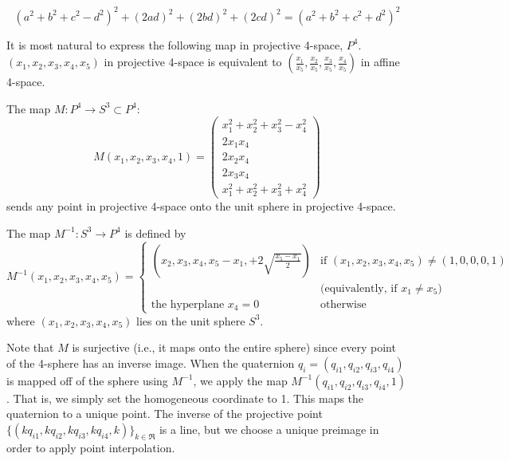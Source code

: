 \begin{lemma}
\begin{equation}
\label{eqn:aida}
(a^2 + b^2 + c^2 - d^2)^2 + (2ad)^2 + (2bd)^2 + (2cd)^2 = 
(a^2 + b^2 + c^2 + d^2)^2
\end{equation}
\end{lemma}

It is most natural to express the following map in projective 4-space, $P^4$.
$(x_1,x_2,x_3,x_4,x_5)$ in projective 4-space is equivalent to
$(\frac{x_1}{x_5},\frac{x_2}{x_5},\frac{x_3}{x_5},\frac{x_4}{x_5})$ 
in affine 4-space.

\begin{corollary}
The map 
$M:P^4 \rightarrow S^3 \subset P^4$:
\begin{equation}
\label{eq:M}
	M(x_1,x_2,x_3,x_4,1) = \left( \begin{array}{c}
		x_1^2+x_2^2+x_3^2-x_4^2 \\
		2x_1x_4 \\
		2x_2x_4 \\
		2x_3x_4 \\
		x_1^2+x_2^2+x_3^2+x_4^2
		\end{array} \right)
\end{equation}
sends any point in projective 4-space onto the unit sphere in projective
4-space.
\end{corollary}

\begin{lemma}
\label{lem:invM}
The map $M^{-1}:S^3 \rightarrow P^4$ is defined by
\begin{equation}
\label{eq:invM}
M^{-1}(x_1,x_2,x_3,x_4,x_5)=
\left\{ \begin{array}{ll}
(x_2,x_3,x_4,x_5-x_1,+2\sqrt{\frac{x_5-x_1}{2}}) 
	& \mbox{if } (x_1,x_2,x_3,x_4,x_5) \neq (1,0,0,0,1) \\
	& \mbox{(equivalently, if } x_1 \neq x_5 \mbox{)} \\
\mbox{the hyperplane } x_4 = 0 
	& \mbox{otherwise}
\end{array} \right.
\end{equation}
where $(x_1,x_2,x_3,x_4,x_5)$ lies on the unit sphere $S^3$.
\end{lemma}

Note that $M$ is surjective (i.e., it maps onto the entire sphere)
since every point of the 4-sphere has an inverse image.
When the quaternion $q_i = (q_{i1},q_{i2},q_{i3},q_{i4})$ is mapped off
of the sphere using $M^{-1}$,
we apply the map $M^{-1}(q_{i1},q_{i2},q_{i3},q_{i4},1)$.
That is, we simply set the homogeneous coordinate to 1.
This maps the quaternion to a unique point.
The inverse of the projective point 
$\{(kq_{i1},kq_{i2},kq_{i3},kq_{i4},k)\}_{k \in \Re}$
is a line,
but we choose a unique preimage in order to apply point interpolation.


